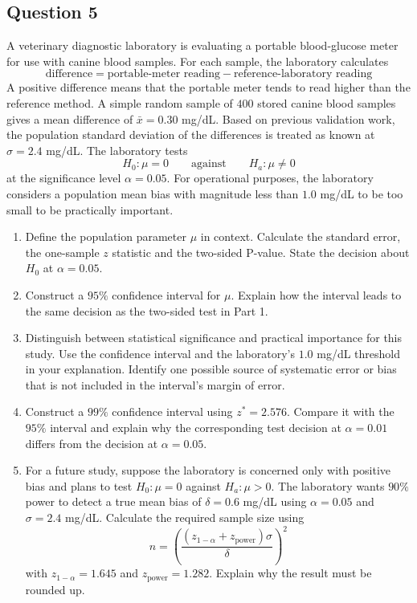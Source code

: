 \documentclass[10pt,letterpaper]{article}
\begin{document}
\newpage

\subsection*{Question 5}
A veterinary diagnostic laboratory is evaluating a portable blood-glucose meter for use with canine blood samples. For each sample, the laboratory calculates
$$\text{difference}=\text{portable-meter reading}-\text{reference-laboratory reading}$$
A positive difference means that the portable meter tends to read higher than the reference method. A simple random sample of $400$ stored canine blood samples gives a mean difference of $\bar{x}=0.30$ mg/dL. Based on previous validation work, the population standard deviation of the differences is treated as known at $\sigma=2.4$ mg/dL.
The laboratory tests
$$H_0:\mu=0 \qquad\text{against}\qquad H_a:\mu\ne 0$$
at the significance level $\alpha=0.05$. For operational purposes, the laboratory considers a population mean bias with magnitude less than $1.0$ mg/dL to be too small to be practically important.
\begin{enumerate}
	\item Define the population parameter $\mu$ in context. Calculate the standard error, the one-sample $z$ statistic and the two-sided P-value. State the decision about $H_0$ at $\alpha=0.05$.
	\item Construct a $95\%$ confidence interval for $\mu$. Explain how the interval leads to the same decision as the two-sided test in Part 1.
	\item Distinguish between statistical significance and practical importance for this study. Use the confidence interval and the laboratory's $1.0$ mg/dL threshold in your explanation. Identify one possible source of systematic error or bias that is not included in the interval's margin of error.
	\item Construct a $99\%$ confidence interval using $z^*=2.576$. Compare it with the $95\%$ interval and explain why the corresponding test decision at $\alpha=0.01$ differs from the decision at $\alpha=0.05$.
	\item For a future study, suppose the laboratory is concerned only with positive bias and plans to test $H_0:\mu=0$ against $H_a:\mu>0$. The laboratory wants $90\%$ power to detect a true mean bias of $\delta=0.6$ mg/dL using $\alpha=0.05$ and $\sigma=2.4$ mg/dL. Calculate the required sample size using
$$n=\left(\frac{(z_{1-\alpha}+z_{\text{power}})\sigma}{\delta}\right)^2$$
with $z_{1-\alpha}=1.645$ and $z_{\text{power}}=1.282$. Explain why the result must be rounded up.
\end{enumerate}
\end{document}
